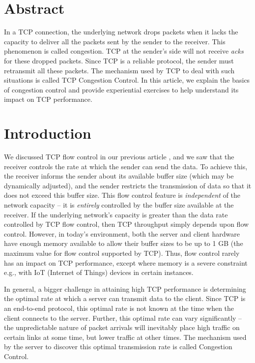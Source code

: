 \begin{multicols}{2}

\section*{Abstract} 

In a TCP connection, the underlying network drops packets when it lacks the capacity to deliver all the packets sent by the sender to the receiver. This phenomenon is called congestion. TCP at the sender’s side will not receive \textit{acks} for these dropped packets. Since TCP is a reliable protocol, the sender must retransmit all these packets. The mechanism used by TCP to deal with such situations is called TCP Congestion Control. In this article, we explain the basics of congestion control and provide experiential exercises to help understand its impact on TCP performance.

\section*{Introduction}

We discussed TCP flow control in our previous article \cite{art2-key01}, and we saw that the receiver controls the rate at which the sender can send the data. To achieve this, the receiver informs the sender about its available buffer size (which may be dynamically adjusted), and the sender restricts the transmission of data so that it does not exceed this buffer size. This flow control feature is \textit{independent} of the network capacity – it is \textit{entirely} controlled by the buffer size available at the receiver. If the underlying network’s capacity is greater than the data rate controlled by TCP flow control, then TCP throughput simply depends upon flow control. However, in today’s environment, both the server and client hardware have enough memory available to allow their buffer sizes to be up to 1 GB (the maximum value for flow control supported by TCP). Thus, flow control rarely has an impact on TCP performance, except where memory is a severe constraint e.g., with IoT (Internet of Things) devices in certain instances.

In general, a bigger challenge in attaining high TCP performance is determining the optimal rate at which a server can transmit data to the client. Since TCP \cite{art2-key02} is an end-to-end protocol, this optimal rate is not known at the time when the client connects to the server. Further, this optimal rate can vary significantly – the unpredictable nature of packet arrivals will inevitably place high traffic on certain links at some time, but lower traffic at other times. The mechanism used by the server to discover this optimal transmission rate is called Congestion Control.


\end{multicols}
